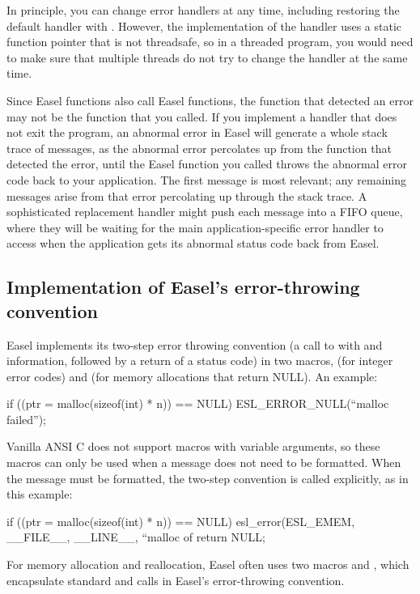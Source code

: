 \documentclass[11pt]{article}
\begin{document}
In principle, you can change error handlers at any time, including
restoring the default handler with
. However, the implementation
of the handler uses a static function pointer that is not threadsafe,
so in a threaded program, you would need to make sure that multiple
threads do not try to change the handler at the same time.

Since Easel functions also call Easel functions, the function that
detected an error may not be the function that you called.  If you
implement a handler that does not exit the program, an abnormal error
in Easel will generate a whole stack trace of 
messages, as the abnormal error percolates up from the function that
detected the error, until the Easel function you called throws the
abnormal error code back to your application. The first
 message is most relevant; any remaining messages
arise from that error percolating up through the stack trace.  A
sophisticated replacement  handler might push each
 message into a FIFO queue, where they will be
waiting for the main application-specific error handler to access when
the application gets its abnormal status code back from Easel.

\subsection{Implementation of Easel's error-throwing convention}

Easel implements its two-step error throwing convention (a call to
 with  and 
information, followed by a return of a status code) in two macros,
 (for integer error codes) and
 (for memory allocations that return
NULL). An example:

\begin{cchunk}
if ((ptr = malloc(sizeof(int) * n)) == NULL) ESL_ERROR_NULL(``malloc failed'');
\end{cchunk}

Vanilla ANSI C does not support macros with variable arguments, so
these macros can only be used when a message does not need to be
formatted. When the message must be formatted, the two-step convention
is called explicitly, as in this example:

\begin{cchunk}
if ((ptr = malloc(sizeof(int) * n)) == NULL)
  {
     esl_error(ESL_EMEM, __FILE__, __LINE__, ``malloc of %
     return NULL;
  }
\end{cchunk}

For memory allocation and reallocation, Easel often uses two macros
 and , which encapsulate
standard  and  calls in Easel's
error-throwing convention.




\end{document}
